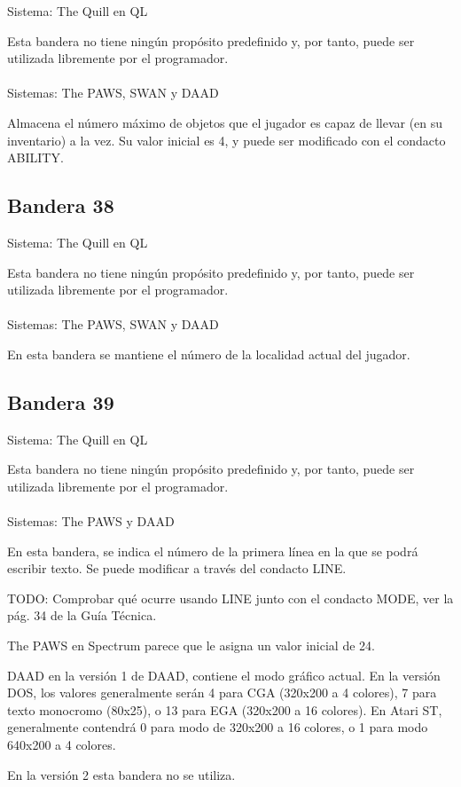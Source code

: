 \documentclass[11pt, a5paper]{article}
\newcommand{\quill}{\textsf{The Quill}\xspace}
\newcommand{\paw}{\textsf{The PAWS}\xspace}
\newcommand{\swan}{\textsf{SWAN}\xspace}
\newcommand{\daad}{\textsf{DAAD}\xspace}
\newcommand{\sistema}[1]{\noindent Sistema: #1 \nopagebreak}
\newcommand{\sistemas}[1]{\noindent Sistemas: #1 \nopagebreak}
\begin{document}
\sistema{\quill en QL}

Esta bandera no tiene ningún propósito predefinido y, por tanto, puede ser utilizada libremente por el programador.
\\\ \\
\sistemas{\paw, \swan y \daad}

Almacena el número máximo de objetos que el jugador es capaz de llevar (en su inventario) a la vez. Su valor inicial es 4, y puede ser modificado con el condacto ABILITY.

\subsection{Bandera 38}

\sistema{\quill en QL}

Esta bandera no tiene ningún propósito predefinido y, por tanto, puede ser utilizada libremente por el programador.
\\\ \\
\sistemas{\paw, \swan y \daad}

En esta bandera se mantiene el número de la localidad actual del jugador.

\subsection{Bandera 39}

\sistema{\quill en QL}

Esta bandera no tiene ningún propósito predefinido y, por tanto, puede ser utilizada libremente por el programador.
\\\ \\
\sistemas{\paw y \daad}

En esta bandera, se indica el número de la primera línea en la que se podrá escribir texto. Se puede modificar a través del condacto LINE.

TODO: Comprobar qué ocurre usando LINE junto con el condacto MODE, ver la pág. 34 de la Guía Técnica.

\paw en Spectrum parece que le asigna un valor inicial de 24.

\daad en la versión 1 de \daad, contiene el modo gráfico actual. En la versión DOS, los valores generalmente serán 4 para CGA (320x200 a 4 colores), 7 para texto monocromo (80x25), o 13 para EGA (320x200 a 16 colores). En Atari ST, generalmente contendrá 0 para modo de 320x200 a 16 colores, o 1 para modo 640x200 a 4 colores.

En la versión 2 esta bandera no se utiliza.
\end{document}
